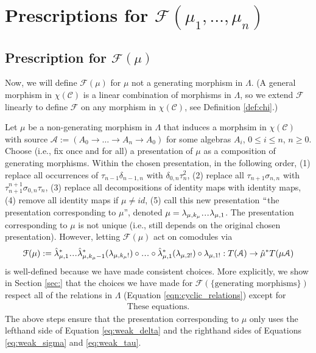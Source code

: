 \section{Prescriptions for 
$\mathcal{F}(\mu_1, \dots, \mu_n)$} 

\subsection{Prescription for $\mathcal{F}(\mu)$} \label{sec:F_of_mu}
Now, we will define $\mathcal{F}(\mu)$ for 
$\mu$ not a generating morphism in $\Lambda$. 
(A general morphism in $\chi(\mathcal{C})$ is a 
linear combination of morphisms in $\Lambda$, so 
we extend $\mathcal{F}$ linearly to define 
$\mathcal{F}$ on any morphism in $\chi(\mathcal{C})$, 
see Definition \ref{def:chi}.)

Let $\mu$ be a non-generating morphism 
in $\Lambda$ that induces a morphsim in 
$\chi(\mathcal{C})$ with source $\mathcal{A} :=
(A_0 \to \dots \to A_n \to A_0)$ for some 
algebras $A_i$, $0 \leq i \leq n$, $n \geq 0$. 
Choose (i.e., fix once and 
for all) a presentation of $\mu$ as a 
composition of generating morphisms. 
Within the chosen presentation, in the 
following order, (1) replace 
all occurrences of $\tau_{n-1} \delta_{n-1,n}$ 
with $\delta_{0,n}\tau_n^2$, (2) replace all 
$\tau_{n+1}\sigma_{n,n}$ with 
$\tau_{n+1}^{n+1}\sigma_{0,n}\tau_n$, 
(3) replace all decompositions of identity 
maps with identity maps, (4) remove all 
identity maps if $\mu \neq id$, (5) call 
this new presentation 
$``$the presentation corresponding to $\mu$'', 
denoted $\mu = \lambda_{\mu,k_\mu}\smdots 
\lambda_{\mu,1}$. The presentation 
corresponding to $\mu$ is not unique (i.e., 
still depends on the original chosen 
presentation). However, letting $\mathcal{F}(\mu)$ 
act on comodules via
\begin{align*}
\mathcal{F}(\mu) := 
\hat{\lambda}_{\mu,1}^*\smdots
  \hat{\lambda}_{\mu,k_\mu-1}^*
  (\lambda_{\mu,k_\mu!})
  \circ \smdots \circ
  \hat{\lambda}_{\mu,1}^*(\lambda_{\mu,2!})
  \circ \lambda_{\mu,1!}: 
  T(\mathcal{A})
  \to \hat{\mu}^*T(\mu \mathcal{A})
\end{align*}
is well-defined because we have made 
consistent choices. More explicitly, 
we show in Section \ref{sec:} that
the choices we have made for 
$\mathcal{F}(\{ 
\textrm{generating morphisms}\})$ 
respect all of the relations in $\Lambda$ 
(Equation \ref{eqn:cyclic_relations}) 
except for 
\begin{align}
\textrm{These equations.}
\end{align}
The above steps ensure that the 
presentation corresponding 
to $\mu$ only uses the lefthand 
side of Equation \ref{eq:weak_delta} and 
the righthand sides of Equations 
\ref{eq:weak_sigma} and \ref{eq:weak_tau}.
%
